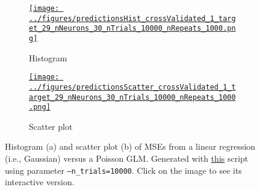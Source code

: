\documentclass[12pt]{article}
\def\figWidth{4.5in}
\begin{document}
\begin{appendices}
\begin{figure}[H]
    \centering
    \begin{subfigure}{\textwidth}
        \centering
        \href{https://www.gatsby.ucl.ac.uk/~rapela/neuroinformatics/2023/ws7/figures/predictionsHist_crossValidated_1_target_29_nNeurons_30_nTrials_10000_nRepeats_1000.html}{\texttt{[image: ../figures/predictionsHist\_crossValidated\_1\_target\_29\_nNeurons\_30\_nTrials\_10000\_nRepeats\_1000.png]}}
        \caption{Histogram}
    \end{subfigure}
    \begin{subfigure}{\textwidth}
        \centering
        \href{https://www.gatsby.ucl.ac.uk/~rapela/neuroinformatics/2023/ws7/figures/predictionsScatter_crossValidated_1_target_29_nNeurons_30_nTrials_10000_nRepeats_1000.html}{\texttt{[image: ../figures/predictionsScatter\_crossValidated\_1\_target\_29\_nNeurons\_30\_nTrials\_10000\_nRepeats\_1000.png]}}
        \caption{Scatter plot}
    \end{subfigure}
    \caption{Histogram (a) and scatter plot (b) of MSEs from a linear
	regression (i.e., Gaussian) versus a Poisson GLM.
	Generated with
	\href{https://github.com/joacorapela/neuroinformatics23/blob/master/worksheets/ws7/mySolution/code/scripts/doComputePredictions.py}{this}
	script using parameter \texttt{--n\_trials=10000}. Click on the image to
	see its interactive version.}
    \label{fig:mses_PoissonVsGaussian_nTrials_10000}
\end{figure}

\end{appendices}



\end{document}
